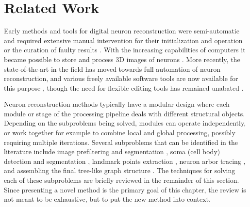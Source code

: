 \section{Related Work}
\label{sec:related-work}
Early methods and tools for digital neuron reconstruction were semi-automatic and required extensive manual intervention for their initialization and operation or the curation of faulty results \cite{glaser1965semi, capowski1981accurate, glaser1990neuron, masseroli1993quantitative}. With the increasing capabilities of computers it became possible to store and process 3D images of neurons \cite{cohen1994automated, belichenko1995confocal}. More recently, the state-of-the-art in the field has moved towards full automation of neuron reconstruction, and various freely available software tools are now available for this purpose \cite{peng2010v3d, longair2011simple, peng2014extensible, peng2014virtual}, though the need for flexible editing tools has remained unabated \cite{luisi2011farsight, dercksen2014filament}.

Neuron reconstruction methods typically have a modular design where each module or stage of the processing pipeline deals with different structural objects. Depending on the subproblems being solved, modules can operate independently, or work together for example to combine local and global processing, possibly requiring multiple iterations. Several subproblems that can be identified in the literature include image prefiltering and segmentation \cite{zhou2015adaptive, turetken2011automated, sironi2016multiscale, mukherjee2013vector}, soma (cell body) detection and segmentation \cite{quan2013neurogps}, landmark points extraction \cite{al2008improved, wang2011broadly, choromanska2012automatic, su2012junction, radojevic2016fuzzy}, neuron arbor tracing \cite{zhao2011automated, liu2016rivulet, leandro2009automatic, radojevic2017automated, xiao2013app2}, and assembling the final tree-like graph structure \cite{zhou2016tremap, turetken2011automated, yuan2009mdl}. The techniques for solving each of these subproblems are briefly reviewed in the remainder of this section. Since presenting a novel method is the primary goal of this chapter, the review is not meant to be exhaustive, but to put the new method into context.

